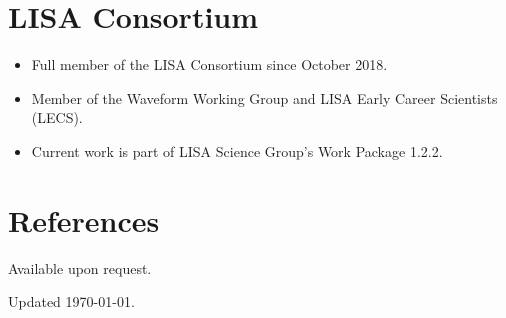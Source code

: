 \documentclass[10.5pt, oneside]{article}   	%
\begin{document}
\section*{LISA Consortium}
\begin{itemize}
\item Full member of the LISA Consortium since October 2018.
\item Member of the Waveform Working Group and LISA Early Career Scientists (LECS).
\item Current work is part of LISA Science Group's Work Package 1.2.2.
\end{itemize} 

\section*{References}
Available upon request.

\vspace*{\fill}
Updated \today.
\end{document}
